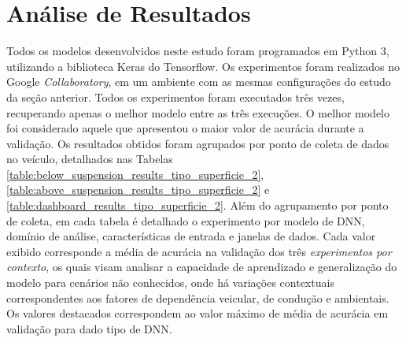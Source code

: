 \section{Análise de Resultados}

Todos os modelos desenvolvidos neste estudo foram programados em Python 3, utilizando a biblioteca Keras do Tensorflow. Os experimentos foram realizados no Google \textit{Collaboratory}, em um ambiente com as mesmas configurações do estudo da seção anterior. Todos os experimentos foram executados três vezes, %
recuperando apenas o melhor modelo entre as três execuções. O melhor modelo foi considerado aquele que apresentou o maior valor de acurácia durante a validação. Os resultados obtidos foram agrupados por ponto de coleta de dados no veículo, detalhados nas Tabelas \ref{table:below_suspension_results_tipo_superficie_2}, \ref{table:above_suspension_results_tipo_superficie_2} e \ref{table:dashboard_results_tipo_superficie_2}. Além do agrupamento por ponto de coleta, em cada tabela é detalhado o experimento por modelo de DNN, domínio de análise, características de entrada e janelas de dados. Cada valor exibido corresponde a média de acurácia na validação dos três \emph{experimentos por contexto}, os quais visam analisar a capacidade de aprendizado e generalização do modelo para cenários não conhecidos, onde há variações contextuais correspondentes aos fatores de dependência veicular, de condução e ambientais. Os valores destacados correspondem ao valor máximo de média de acurácia em validação para dado tipo de DNN.

